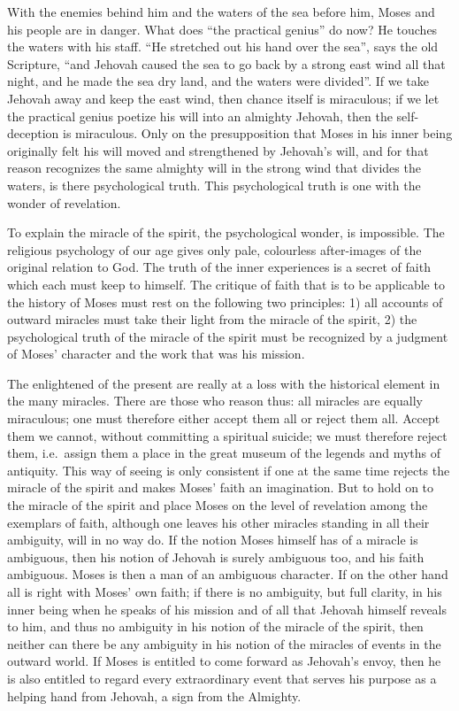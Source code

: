 \documentclass[12pt,a4paper,openany]{book}
\newcommand{\opage}[1]{\marginnote{\footnotesize\textit{[#1]}}}
\begin{document}
With the enemies behind him and the waters of the sea
before him, Moses and his people are in danger. What does
``the practical genius'' do now? He touches the waters with his
staff. ``He stretched out his hand over the sea'', says the
old Scripture, ``and Jehovah caused the sea to go back by a
strong east wind all that night, and he made the sea
dry land, and the waters were divided''. If we take Jehovah
away and keep the east wind, then chance itself is
miraculous; if we let the practical genius poetize his will
into an almighty Jehovah, then the self-deception is miraculous.
Only on the presupposition that Moses in his inner being
originally felt his will moved and strengthened by
Jehovah's will, and for that reason recognizes the same almighty
will in the strong wind that divides
the waters, is there psychological truth. This psychological
truth is one with the wonder of revelation.

To explain the miracle of the spirit, the psychological wonder,
is impossible. The religious psychology of our age gives
\setcounter{footnote}{0}%
\opage{28}only pale, colourless after-images of the original
relation to God. The truth of the inner experiences is a
secret of faith which each must keep to himself.
The critique of faith that is to be applicable to the history
of Moses must rest on the following two principles:
1) all accounts of outward miracles must
take their light from the miracle of the spirit, 2) the psychological
truth of the miracle of the spirit must be recognized by a judgment
of Moses' character and the work that was
his mission.

The enlightened of the present are really at a loss with
the historical element in the many miracles. There are those who
reason thus: all miracles are equally miraculous;
one must therefore either accept them all or reject
them all. Accept them we cannot, without
committing a spiritual suicide; we must therefore reject
them, i.e.\ assign them a place in the great museum of
the legends and myths of antiquity. This way of seeing is only
consistent if one at the same time rejects the miracle of the spirit
and makes Moses' faith an imagination. But
to hold on to the miracle of the spirit and place Moses on the level of revelation
among the exemplars of faith, although one
leaves his other miracles standing in all their ambiguity,
will in no way do. If the notion Moses
himself has of a miracle is ambiguous, then his notion
of Jehovah is surely ambiguous too, and his faith ambiguous.
Moses is then a man of an ambiguous character.
If on the other hand all is right with Moses' own faith; if there is
no ambiguity, but full clarity, in his inner being
when he speaks of his mission and of all that
Jehovah himself reveals to him, and thus no ambiguity
in his notion of the miracle of the spirit, then neither
\setcounter{footnote}{0}%
\opage{29}can there be any ambiguity in his notion of
the miracles of events in the outward world. If Moses is entitled
to come forward as Jehovah's envoy, then
he is also entitled to regard every extraordinary
event that serves his purpose as a helping hand
from Jehovah, a sign from the Almighty.
\end{document}
